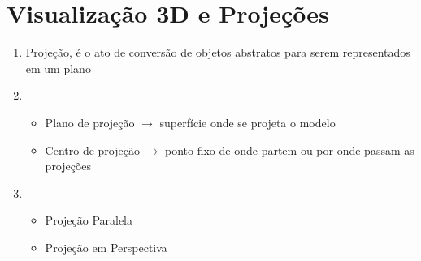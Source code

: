\section*{Visualização 3D e Projeções}

	\begin{enumerate}[label=\arabic*)]
	    \setlength\itemsep{1em}
	    
	    \item 
	    Projeção, é o ato de conversão de objetos abstratos para
	    serem representados em um plano
	    \item 
	    
	    \begin{itemize}
	    	\item Plano de projeção $\rightarrow$ superfície onde se projeta o modelo 
	    	
	    	\item Centro de projeção $\rightarrow$ ponto fixo de onde partem ou por onde passam
	    	as projeções
	    \end{itemize}
	    \item 
	    
	    \begin{itemize}
	    	\item Projeção Paralela
	    	
	    	\item Projeção em Perspectiva
	    \end{itemize}
	    

	\end{enumerate}
	
